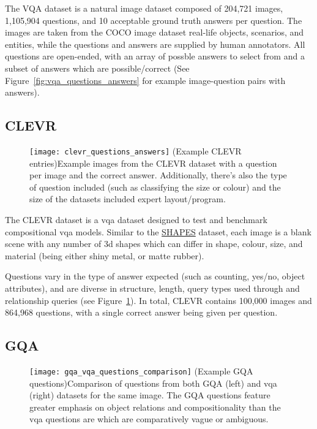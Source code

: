 The VQA dataset \cite{agrawal_vqa_2016} is a natural image dataset composed of 204,721 images, 1,105,904 questions, and 10 acceptable ground truth answers per question.
The images are taken from the COCO image dataset \cite{lin_microsoft_2015} real-life objects, scenarios, and entities, while the questions and answers are supplied by human annotators.
All questions are open-ended, with an array of possble answers to select from and a subset of answers which are possible/correct (See Figure~\ref{fig:vqa_questions_answers} for example image-question pairs with answers).

\subsection{CLEVR}
\label{subsec:clevr_dataset}

\begin{figure}[htbp]
    \centering
    \texttt{[image: clevr\_questions\_answers]}
    \captionsource(Example CLEVR entries){Example images from the CLEVR dataset with a question per image and the correct answer. Additionally, there's also the type of question included (such as classifying the size or colour) and the size of the datasets included expert layout/program. \label{fig:clevr_questions_answers}}{\citeauthor{johnson_clevr_2016}\cite{johnson_clevr_2016}}
\end{figure}

The CLEVR dataset \cite{johnson_clevr_2016} is a \gls{vqa} dataset designed to test and benchmark compositional \gls{vqa} models.
Similar to the \hyperref[subsec:shapes_dataset]{SHAPES} dataset, each image is a blank scene with any number of 3d shapes which can differ in shape, colour, size, and material (being either shiny metal, or matte rubber).

Questions vary in the type of answer expected (such as counting, yes/no, object attributes), and are diverse in structure, length, query types used through and relationship queries (see Figure~\ref{fig:clevr_questions_answers}).
In total, CLEVR contains 100,000 images and 864,968 questions, with a single correct answer being given per question.

\subsection{GQA}
\label{subsec:gqa_dataset}

\begin{figure}[htbp]
    \centering
    \texttt{[image: gqa\_vqa\_questions\_comparison]}
    \captionsource(Example GQA questions){Comparison of questions from both GQA (left) and \gls{vqa} (right) datasets for the same image. The GQA questions feature greater emphasis on object relations and compositionality than the \gls{vqa} questions are which are comparatively vague or ambiguous. \label{fig:gqa_and_vqa_questions_compared}}{\citeauthor{hudson_gqa_2019}\cite{hudson_gqa_2019}}
\end{figure}


